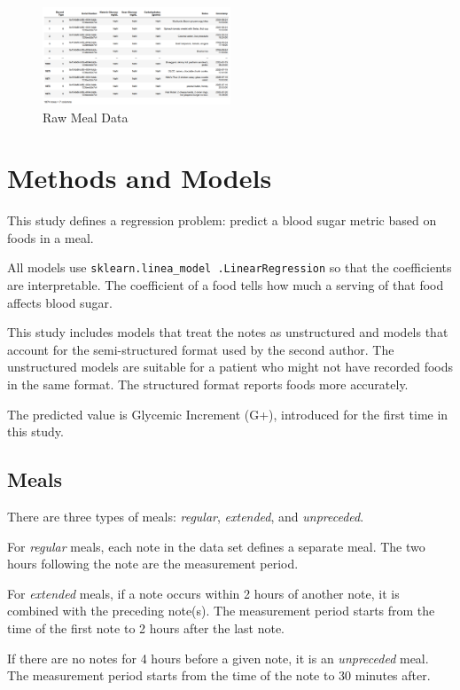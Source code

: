 \documentclass[conference]{IEEEtran}
\begin{document}
\begin{figure}[htbp]
    \includegraphics[width=0.5\textwidth]{images/meal_data.png}
    \caption{Raw Meal Data}
    \label{fig:meal_data}
\end{figure}

\section{Methods and Models}

This study defines a regression problem: predict a blood sugar metric based on foods in a meal.

All models use \texttt{sklearn.linea\_model
.LinearRegression} so that the coefficients are interpretable. The coefficient of a food tells how much a serving of that food affects blood sugar.

This study includes models that treat the notes as unstructured and models that account for the semi-structured format used by the second author. The unstructured models are suitable for a patient who might not have recorded foods in the same format. The structured format reports foods more accurately.

The predicted value is Glycemic Increment (G+), introduced for the first time in this study.

\subsection{Meals}

There are three types of meals: \emph{regular}, \emph{extended}, and \emph{unpreceded}.

For \emph{regular} meals, each note in the data set defines a separate meal. The two hours following the note are the measurement period.

For \emph{extended} meals, if a note occurs within 2 hours of another note, it is combined with the preceding note(s). The measurement period starts from the time of the first note to 2 hours after the last note.

If there are no notes for 4 hours before a given note, it is an \emph{unpreceded} meal. The measurement period starts from the time of the note to 30 minutes after.
\end{document}
